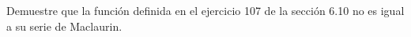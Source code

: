 \item Demuestre que la función definida en el ejercicio 107 de la sección 6.10 no es igual a su serie de Maclaurin.
